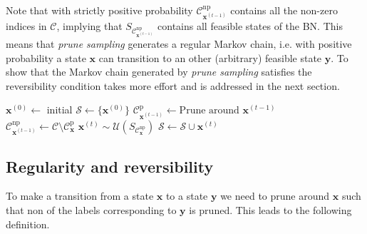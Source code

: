 \documentclass[a4paper, twoside, 11pt]{report}
\newcommand{\bfx}{{\mathbf{x}}}
\newcommand{\C}{{\mathcal C}}
\newcommand{\U}{{\mathcal{U}}}
\theoremstyle{plain}
\theoremstyle{definition}
\theoremstyle{remark}
\newcommand{\ps}{\textit{prune sampling }}
\newcommand{\bfy}{{\mathbf{y}}}
\begin{document}
Note that with strictly positive probability $\C_{\bfx^{(t-1)}}^{\text{np}}$ contains all the non-zero indices in $\C$, implying that $S_{\C_{\bfx^{(t-1)}}^{\text{np}}}$ contains all feasible states of the BN. This means that \ps generates a regular Markov chain, i.e. with positive probability a state $\bfx$ can transition to an other (arbitrary) feasible state $\bfy$. To show that the Markov chain generated by \ps satisfies the reversibility condition takes more effort and is addressed in the next section. 
\begin{algorithm}[h!]
\renewcommand\thealgorithm{1}
\caption{Prune sampling algorithm}
\label{prunealg}
\begin{algorithmic}
\State $\mathbf{x}^{(0)} \gets $ initial
     \State $\mathcal{S} \gets \{\mathbf{x}^{(0)}\}$
     \State $\C_{\bfx^{(t-1)}}^{\text{p}} \gets \text{Prune around } \mathbf{x}^{(t-1)}$ \\ 
	\State $\C_{\bfx^{(t-1)}}^{\text{np}} \gets \mathcal{C} \setminus \C_\bfx^{\text{p}}$  
     \State $\mathbf{x}^{(t)} \sim  \U(S_{\C_\bfx^{\text{np}}}) $ 
     \State $\mathcal{S} \gets \mathcal{S} \cup \mathbf{x}^{(t)}$
     \EndFor
     \State {}
\EndFunction
\end{algorithmic}
\end{algorithm}

\subsection{Regularity and reversibility}
To make a transition from a state $\bfx$ to a state $\bfy$ we need to prune around $\bfx$ such that non of the labels corresponding to $\bfy$ is pruned. This leads to the following definition. 
\end{document}
